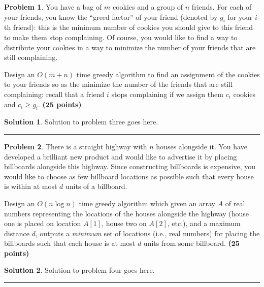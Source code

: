 \documentclass{article}
\theoremstyle{definition}
\newtheorem{problem}{Problem}
\def\fline{\rule{0.75\linewidth}{0.5pt}}
\newcommand{\finishline}{\vspace{-15pt}\begin{center}\fline\end{center}}
\newtheorem*{solution*}{Solution}
\newenvironment{solution}{\begin{solution*}}{{\finishline} \end{solution*}}
\newcommand{\grade}[1]{\hfill{\textbf{($\mathbf{#1}$ points)}}}
\begin{document}
\smallskip

\begin{problem}
	You have a bag of $m$ cookies and a group of $n$ friends. For each of your friends, you know the ``greed factor'' of your friend (denoted by $g_i$ for your $i$-th friend): 
	this is the minimum number of cookies you should give to this friend to make them stop complaining. Of course, you would like to find a way to distribute your cookies in a way to minimize the number of your friends that are still complaining. 
	
	Design an $O(m+n)$ time greedy algorithm to find an assignment of the cookies to your friends so as the minimize the number of the friends that are still complaining: 
	recall that a friend $i$ stops complaining if we assign them $c_i$ cookies and $c_i \geq g_i$. \grade{25}
	
\end{problem}

\begin{solution}
	Solution to problem three goes here. 
\end{solution}

\smallskip

\begin{problem}\label{billboard}
	There is a straight highway with $n$ houses alongside it. You have developed a brilliant new product and would like to advertise it by placing billboards alongside this highway. 
	Since constructing billboards is expensive, you would like to choose as few billboard locations as possible such that every house is within at most $d$ units of a billboard. 
	 
	Design an $O(n\log{n})$ time greedy algorithm which given an array $A$ of real numbers representing the locations of the houses alongside the highway (house one is placed on location $A[1]$, house two on $A[2]$, etc.), and a maximum distance $d$,
  	outputs a \emph{minimum} set of locations (i.e., real numbers) for placing the billboards such that each house is at most $d$ units from some billboard. \grade{25}
		
\end{problem}

\begin{solution}
	Solution to problem four goes here. 
\end{solution}


\smallskip
\end{document}
